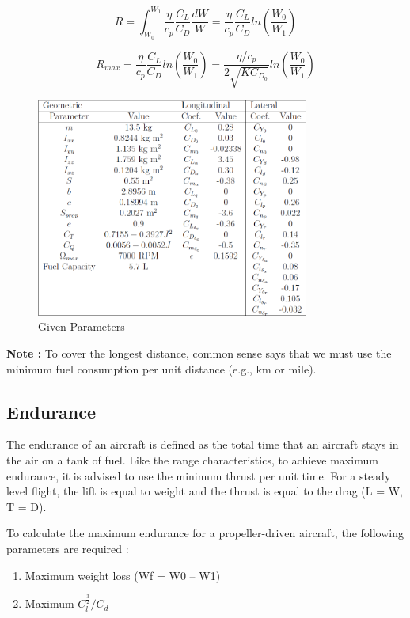 \begin{equation}
R = \int_{W_0}^{W_1} \frac{\eta}{c_p} \frac{C_L}{C_D} \frac{dW}{W} = \frac{\eta}{c_p} \frac{C_L}{C_D} ln(\frac{W_0}{W_1})	
\end{equation}

\begin{equation}
	R_{max} = \frac{\eta}{c_p} \frac{C_L}{C_D} ln(\frac{W_0}{W_1}) = \frac{\eta/c_p}{2\sqrt{KC_{D_0}}}ln(\frac{W_0}{W_1})	
\end{equation}

\begin{figure}
	\centering
	\includegraphics[width=0.8\textwidth]{Images/Fixed_Wing_parameters}
	\caption{Given Parameters}
	\label{fig:Parameters}
\end{figure}

\textbf{Note :} To cover the longest distance, common sense says that we must use the minimum fuel consumption per unit distance (e.g., km or mile).

\subsection{Endurance}

The endurance of an aircraft is defined as the total time that an aircraft stays in the air on a tank of fuel. Like the range characteristics, to achieve maximum endurance, it is advised to use the minimum thrust per unit time. For a steady level flight, the lift is equal to weight and the thrust is equal to the drag (L = W, T = D). 

To calculate the maximum endurance for a propeller-driven aircraft, the following parameters are required :

\begin{enumerate}
	\item Maximum weight loss (Wf = W0 – W1)
	\item Maximum $ C_l^\frac{3}{2}/C_d $
\end{enumerate}

